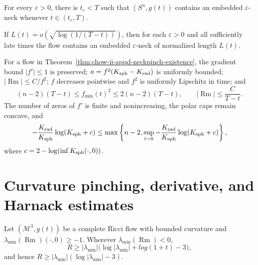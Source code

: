 \begin{proposition}
\label{prop:chow-ii-appd-embedded-epsilon-necks}
For every $\varepsilon>0$, there is $t_\varepsilon<T$ such that
$(S^n,g(t))$ contains an embedded $\varepsilon$-neck whenever
$t\in(t_\varepsilon,T)$.
\end{proposition}

\begin{remark}
\label{rem:chow-ii-appd-growing-neck-length}
If $L(t)=o(\sqrt{\log(1/(T-t))})$, then for each $\varepsilon>0$ and all
sufficiently late times the flow contains an embedded $\varepsilon$-neck of
normalized length $L(t)$.
\end{remark}

\begin{proposition}
\label{prop:chow-ii-appd-neckpinch-estimates}
For a flow in Theorem~\ref{thm:chow-ii-appd-neckpinch-existence}, the gradient
bound $|f'|\leq1$ is preserved; $a=f^2(K_{\rm sph}-K_{\rm rad})$ is uniformly
bounded; $|\operatorname{Rm}|\leq C/f^2$; $f$ decreases pointwise and $f^2$
is uniformly Lipschitz in time; and
\[
 (n-2)(T-t)\leq f_{\min}(t)^2\leq2(n-2)(T-t),\qquad
 |\operatorname{Rm}|\leq\frac C{T-t}.
\]
The number of zeros of $f'$ is finite and nonincreasing, the polar caps remain
concave, and
\[
 -\frac{K_{\rm rad}}{K_{\rm sph}}\log(K_{\rm sph}+c)
 \leq\max\left\{n-2,
 \sup_{t=0}-\frac{K_{\rm rad}}{K_{\rm sph}}
 \log(K_{\rm sph}+c)\right\},
\]
where $c=2-\log(\inf K_{\rm sph}(\cdot,0))$.
\end{proposition}

\section{Curvature pinching, derivative, and Harnack estimates}

\begin{theorem}
\label{thm:chow-ii-appd-hamilton-ivey}
Let $(\mathcal M^3,g(t))$ be a complete Ricci flow with bounded curvature and
$\lambda_{\min}(\operatorname{Rm})(\cdot,0)\geq-1$. Wherever
$\lambda_{\min}(\operatorname{Rm})<0$,
\[
 R\geq|\lambda_{\min}|\bigl(\log|\lambda_{\min}|+log(1+t)-3\bigr),
\]
and hence $R\geq|\lambda_{\min}|(\log|\lambda_{\min}|-3)$.
\end{theorem}

